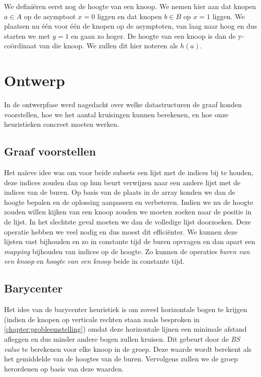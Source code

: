\documentclass[kulak]{kulakarticle} %
\begin{document}

\noindent We definiëren eerst nog de hoogte van een knoop. We nemen hier aan dat knopen $a \in A$ op de asymptoot $x = 0$ liggen en dat knopen $b \in B$ op $x = 1$ liggen. We plaatsen nu één voor één de knopen op de asymptoten, van laag naar hoog en dus starten we met $y = 1$ en gaan zo hoger. De hoogte van een knoop is dan de y-coördinaat van die knoop. We zullen dit hier noteren als $h(a)$.

\section{Ontwerp}

In de ontwerpfase werd nagedacht over welke datastructuren de graaf konden voorstellen, hoe we het aantal kruisingen kunnen berekenen, en hoe onze heuristieken concreet moeten werken.

\subsection{Graaf voorstellen}

Het naïeve idee was om voor beide subsets een lijst met de indices bij te houden, deze indices zouden dan op hun beurt verwijzen naar een andere lijst met de indices van de buren. Op basis van de plaats in de array konden we dan de hoogte bepalen en de oplossing aanpassen en verbeteren. Indien we nu de hoogte zouden willen kijken van een knoop zouden we moeten zoeken naar de positie in de lijst. In het slechtste geval moeten we dan de volledige lijst doorzoeken. Deze operatie hebben we veel nodig en dus moest dit efficiënter. We kunnen deze lijsten vast bijhouden en zo in constante tijd de buren opvragen en dan apart een \textit{mapping} bijhouden van indices op de hoogte. Zo kunnen de operaties \textit{buren van een knoop} en \textit{hoogte van een knoop} beide in constante tijd.  

\subsection{Barycenter}

Het idee van de barycenter heuristiek is om zoveel horizontale bogen te krijgen (indien de knopen op verticale rechten staan zoals besproken in \ref{chapter:probleemstelling}) omdat deze horizontale lijnen een minimale afstand afleggen en dus minder andere bogen zullen kruisen. Dit gebeurt door de \textit{BS value} te berekenen voor elke knoop in de groep. Deze waarde wordt berekent als het gemiddelde van de hoogtes van de buren. Vervolgens zullen we de groep herordenen op basis van deze waarden. \\
\end{document}
